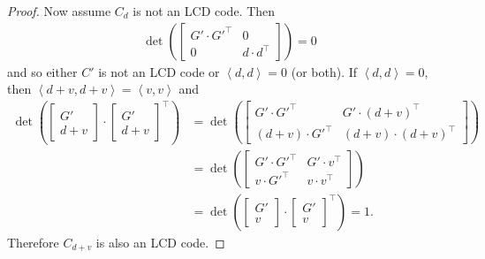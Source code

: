 \documentclass[10pt,a4paper]{amsart}
\newcommand{\Ang}[1]{\left\langle#1\right\rangle}
\begin{document}
\begin{proof}
	Now assume $C_d$ is not an LCD code.
	Then
	\begin{align*}
		\det \left( \begin{bmatrix}
			G' \cdot G'^\top & 0 \\
			0 & d \cdot d^\top
		\end{bmatrix} \right)
		= 0
	\end{align*}
	and so either $C'$ is not an LCD code or $\Ang{d, d} = 0$ (or both).
	If $\Ang{d, d} = 0$, then $\Ang{d + v, d + v} = \Ang{v, v}$ and
	\begin{align*}
		\det \left( \begin{bmatrix}
			G' \\
			d + v
		\end{bmatrix} \cdot {\begin{bmatrix}
			G' \\
			d + v
		\end{bmatrix}}^\top \right)
		&= \det \left( \begin{bmatrix}
			G' \cdot G'^\top & G' \cdot {(d + v)}^\top \\
			(d + v) \cdot G'^\top & (d + v) \cdot {(d + v)}^\top
		\end{bmatrix} \right) \\
		&= \det \left( \begin{bmatrix}
			G' \cdot G'^\top & G' \cdot v^\top \\
			v \cdot G'^\top & v \cdot v^\top
		\end{bmatrix} \right) \\
		&= \det \left( \begin{bmatrix}
			G' \\
			v
		\end{bmatrix} \cdot {\begin{bmatrix}
			G' \\
			v
		\end{bmatrix}}^\top \right)
		= 1.
	\end{align*}
	Therefore $C_{d + v}$ is also an LCD code.


\end{proof}
\end{document}
